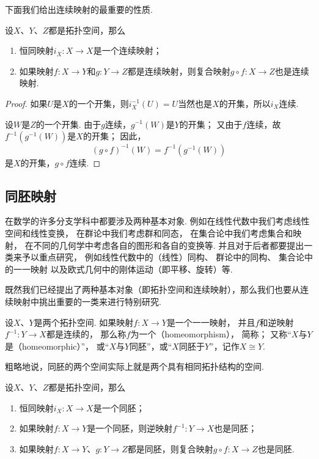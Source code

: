 下面我们给出连续映射的最重要的性质.

\begin{theorem}\label{theorem:拓扑学.拓扑空间之间的连续映射的性质}
设\(X\)、\(Y\)、\(Z\)都是拓扑空间，那么
\begin{enumerate}
\item 恒同映射\(i_X\colon X \to X\)是一个连续映射；
\item 如果映射\(f\colon X \to Y\)和\(g\colon Y \to Z\)都是连续映射，则复合映射\(g \circ f\colon X \to Z\)也是连续映射.
\end{enumerate}
\begin{proof}
如果\(U\)是\(X\)的一个开集，则\(i_X^{-1}(U) = U\)当然也是\(X\)的开集，所以\(i_X\)连续.

设\(W\)是\(Z\)的一个开集.
由于\(g\)连续，\(g^{-1}(W)\)是\(Y\)的开集；
又由于\(f\)连续，故\(f^{-1}(g^{-1}(W))\)是\(X\)的开集；
因此，\[
(g \circ f)^{-1}(W) = f^{-1}(g^{-1}(W))
\]是\(X\)的开集，\(g \circ f\)连续.
\end{proof}
\end{theorem}

\subsection{同胚映射}
在数学的许多分支学科中都要涉及两种基本对象.
例如在线性代数中我们考虑线性空间和线性变换，
在群论中我们考虑群和同态，
在集合论中我们考虑集合和映射，
在不同的几何学中考虑各自的图形和各自的变换等.
并且对于后者都要提出一类来予以重点研究，
例如线性代数中的（线性）同构、%
群论中的同构、%
集合论中的一一映射%
以及欧式几何中的刚体运动（即平移、旋转）等.

既然我们已经提出了两种基本对象（即拓扑空间和连续映射），那么我们也要从连续映射中挑出重要的一类来进行特别研究.

\begin{definition}\label{definition:拓扑学.同胚映射的概念}
设\(X\)、\(Y\)是两个拓扑空间.
如果映射\(f\colon X \to Y\)是一个一一映射，
并且\(f\)和逆映射\(f^{-1}\colon Y \to X\)都是连续的，
那么称\(f\)为一个（homeomorphism），
简称；
又称“\(X\)与\(Y\)是（homeomorphic）”，
或“\(X\)与\(Y\)同胚”，或“\(X\)同胚于\(Y\)”，记作\(X \cong Y\).
\end{definition}

粗略地说，同胚的两个空间实际上就是两个具有相同拓扑结构的空间.

\begin{theorem}\label{theorem:拓扑学.同胚映射的性质}
设\(X\)、\(Y\)、\(Z\)都是拓扑空间，那么
\begin{enumerate}
\item 恒同映射\(i_X\colon X \to X\)是一个同胚；
\item 如果映射\(f\colon X \to Y\)是一个同胚，则逆映射\(f^{-1}\colon Y \to X\)也是同胚；
\item 如果映射\(f\colon X \to Y\)、\(g\colon Y \to Z\)都是同胚，则复合映射\(g \circ f\colon X \to Z\)也是同胚.
\end{enumerate}
\end{theorem}

